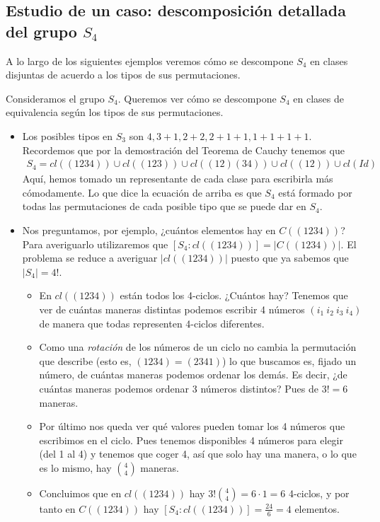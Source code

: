 \subsection{Estudio de un caso: descomposición detallada del grupo $S_4$}
\label{sec:descomposicons4}

A lo largo de los siguientes ejemplos veremos cómo se descompone $S_4$ en clases disjuntas de acuerdo a los tipos de sus permutaciones.

\begin{ej}
	Consideramos el grupo $S_4$. Queremos ver cómo se descompone $S_4$ en clases de equivalencia según los tipos de sus permutaciones.
	
	\begin{itemize}
		\item Los posibles tipos en $S_3$ son $4, 3+1, 2+2, 2+1+1, 1+1+1+1$. Recordemos que por la demostración del Teorema de Cauchy tenemos que
		\begin{align*}
			S_4 = cl((1234)) \cup cl((123)) \cup cl((12)(34)) \cup cl((12)) \cup cl(Id)
		\end{align*}
		Aquí, hemos tomado un representante de cada clase para escribirla más cómodamente. Lo que dice la ecuación de arriba es que $S_4$ está formado por todas las permutaciones de cada posible tipo que se puede dar en $S_4$.
		\item Nos preguntamos, por ejemplo, ¿cuántos elementos hay en $C((1234))$? Para averiguarlo utilizaremos que $[S_4:cl((1234))] = |C((1234))|$. El problema se reduce a averiguar $|cl((1234))|$ puesto que ya sabemos que $|S_4| = 4!$.
		\begin{itemize}
			\item En $cl((1234))$ están todos los 4-ciclos. ¿Cuántos hay? Tenemos que ver de cuántas maneras distintas podemos escribir 4 números $(i_1\ i_2\ i_3\ i_4)$ de manera que todas representen 4-ciclos diferentes.
			\item Como una \textit{rotación} de los números de un ciclo no cambia la permutación que describe (esto es, $(1234) = (2341)$) lo que buscamos es, fijado un número, de cuántas maneras podemos ordenar los demás. Es decir, ¿de cuántas maneras podemos ordenar 3 números distintos? Pues de $3! = 6$ maneras.
			\item Por último nos queda ver qué valores pueden tomar los 4 números que escribimos en el ciclo. Pues tenemos disponibles 4 números para elegir (del 1 al 4) y tenemos que coger 4, así que solo hay una manera, o lo que es lo mismo, hay $\binom{4}{4}$ maneras.
			\item Concluimos que en $cl((1234))$ hay $3! \binom{4}{4} = 6 \cdot 1 = 6$ 4-ciclos, y por tanto en $C((1234))$ hay $[S_4:cl((1234))] = \frac{24}{6} = 4$ elementos.

\end{itemize}
\end{itemize}
\end{ej}
